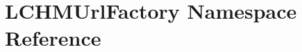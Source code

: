 \hypertarget{namespaceLCHMUrlFactory}{\section{L\+C\+H\+M\+Url\+Factory Namespace Reference}
\label{namespaceLCHMUrlFactory}
}

